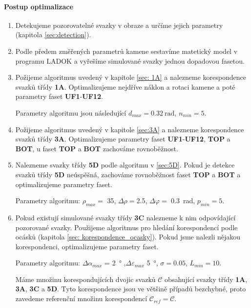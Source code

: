 \paragraph{Postup optimalizace}
\begin{enumerate}
\item Detekujeme pozorovatelné svazky v obraze a určíme jejich parametry (kapitola \ref{sec:detection}). 

\item Podle předem změřených parametrů kamene sestavíme matetický model v programu LADOK a vyřešíme simulované svazky jednou dopadovou fasetou. 

\item Požijeme algoritmus uvedený v kapitole \ref{sec: 1A} a  nalezneme korespondence svazků třídy \textbf{1A}. Optimalizujeme nejdříve náklon a rotaci kamene a poté parametry faset \textbf{UF1}-\textbf{UF12}.

Parametry algoritmu jsou následující $d_{max} = \SI{0.32}{\radian}$, $n_{min} = 5$.

\item Požijeme algoritmus uvedený v kapitole \ref{sec:3A} a  nalezneme korespondence svazků třídy \textbf{3A}. Optimalizujeme parametry faset \textbf{UF1}-\textbf{UF12}, \textbf{TOP} a \textbf{BOT}, u faset \textbf{TOP} a \textbf{BOT} zachováme rovnoběžnost. 

\item Nalezneme svazky třídy \textbf{5D} podle algoritmu v \ref{sec:5D}. Pokud je detekce svazků třídy \textbf{5D} neúspěšná, zachováme rovnoběžnost faset \textbf{TOP} a \textbf{BOT} a optimalizujeme parametry faset.

Parametry algoritmu: $\rho_{max} = $ \SI{35}{\px}, $\Delta\rho = $\SI{2.5}{\px},  $\Delta\varphi = $ \SI{0.3}{\radian},   $p_{min} = 5 $.

\item Pokud existují simulované svazky třídy \textbf{3C} nalezneme k nim odpovídající pozorované svazky. Použijeme algoritmus pro hledání korespondencí podle ocásků (kapitola \ref{sec: korespondence_ocasky}). Pokud jsme nalezli nějakou korespondenci, optimalizujeme parametry faset.

Parametry algoritmu: $\Delta\alpha_{max}$ = \SI{2}{\degree} ,$\Delta\varepsilon_{max}$ \SI{5}{\degree}, $\sigma = 0.05$, $L_{min} = 10$.

	Máme množinu korespondujících dvojic svazků $\mathcal{C}$ obsahující svazky třídy \textbf{1A}, \textbf{3A}, \textbf{3C} a \textbf{5D}. Tyto korespondence jsou ve většině případů bezchybné, proto zavedeme referenční množinu korespondencí $\mathcal{C}_{ref} = \mathcal{C}$.    


\end{enumerate}
